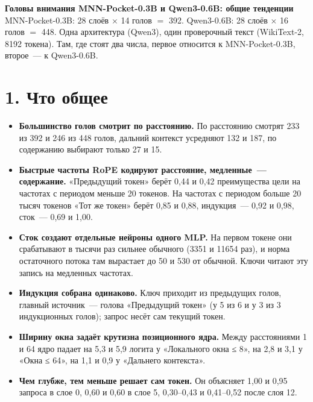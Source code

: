 \documentclass[10pt]{article}
\begin{document}
{\LARGE\bfseries Головы внимания MNN-Pocket-0.3B и Qwen3-0.6B: общие тенденции}\\[0.2em]
{\color{ink2} MNN-Pocket-0.3B: 28 слоёв $\times$ 14 голов $=$ 392. Qwen3-0.6B: 28 слоёв $\times$ 16 голов $=$ 448. Одна архитектура (Qwen3), один проверочный текст (WikiText-2, 8192 токена). Там, где стоят два числа, первое относится к MNN-Pocket-0.3B, второе~— к Qwen3-0.6B.}

\section*{1. Что общее}
\begin{itemize}
\item \textbf{Большинство голов смотрит по расстоянию.} По расстоянию смотрят 233 из 392 и 246 из 448 голов, дальний контекст усредняют 132 и 187, по содержанию выбирают только 27 и 15.
\item \textbf{Быстрые частоты RoPE кодируют расстояние, медленные~— содержание.} «Предыдущий токен» берёт 0,44 и 0,42 преимущества цели на частотах с периодом меньше 20 токенов. На частотах с периодом больше 20 тысяч токенов «Тот же токен» берёт 0,85 и 0,88, индукция~— 0,92 и 0,98, сток~— 0,69 и 1,00.
\item \textbf{Сток создают отдельные нейроны одного MLP.} На первом токене они срабатывают в тысячи раз сильнее обычного (3351 и 11654 раз), и норма остаточного потока там вырастает до 50 и 530 от обычной. Ключи читают эту запись на медленных частотах.
\item \textbf{Индукция собрана одинаково.} Ключ приходит из предыдущих голов, главный источник~— голова «Предыдущий токен» (у 5 из 6 и у 3 из 3 индукционных голов); запрос несёт сам текущий токен.
\item \textbf{Ширину окна задаёт крутизна позиционного ядра.} Между расстояниями 1 и 64 ядро падает на 5,3 и 5,9 логита у «Локального окна ≤ 8», на 2,8 и 3,1 у «Окна ≤ 64», на 1,1 и 0,9 у «Дальнего контекста».
\item \textbf{Чем глубже, тем меньше решает сам токен.} Он объясняет 1,00 и 0,95 запроса в слое 0, 0,60 и 0,60 в слое 5, 0,30–0,43 и 0,41–0,52 после слоя 12.
\end{itemize}
\end{document}
